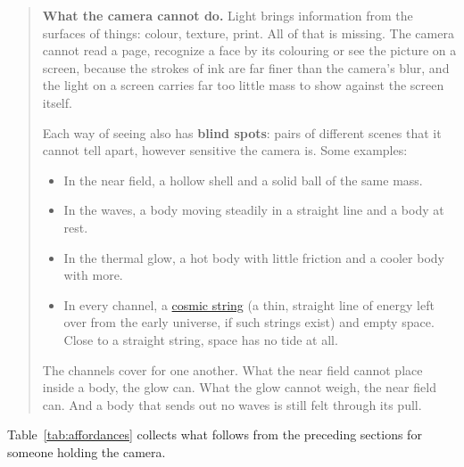 \begin{quote}
\textbf{What the camera cannot do.} Light brings information from the surfaces
of things: colour, texture, print. All of that is missing. The camera cannot
read a page, recognize a face by its colouring or see the picture on a screen,
because the strokes of ink are far finer than the camera's blur, and the light
on a screen carries far too little mass to show against the screen itself.

Each way of seeing also has \textbf{blind spots}: pairs of different scenes that
it cannot tell apart, however sensitive the camera is. Some examples:
\begin{itemize}
\item In the near field, a hollow shell and a solid ball of the same mass.
\item In the waves, a body moving steadily in a straight line and a body at
rest.
\item In the thermal glow, a hot body with little friction and a cooler body
with more.
\item In every channel, a
\href{https://en.wikipedia.org/wiki/Cosmic_string}{cosmic string} (a thin,
straight line of energy left over from the early universe, if such strings
exist) and empty space. Close to a straight string, space has no tide at all.
\end{itemize}

The channels cover for one another. What the near field cannot place inside a
body, the glow can. What the glow cannot weigh, the near field can. And a body
that sends out no waves is still felt through its pull.
\end{quote}

Table~\ref{tab:affordances} collects what follows from the preceding sections
for someone holding the camera.

